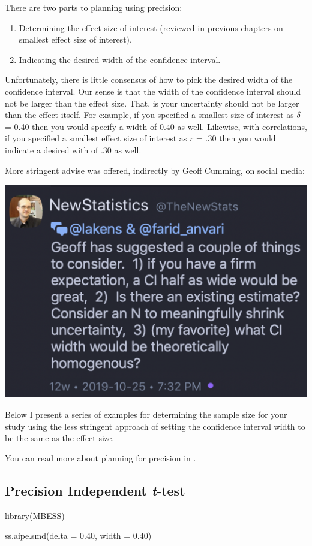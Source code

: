 \documentclass[
]{krantz}
\makeatletter
\newenvironment{Shaded}{\begin{snugshade}}{\end{snugshade}}
\newcommand{\AttributeTok}[1]{\textcolor[rgb]{0.61,0.61,0.61}{#1}}
\newcommand{\FloatTok}[1]{\textcolor[rgb]{0.06,0.06,0.06}{#1}}
\newcommand{\FunctionTok}[1]{\textcolor[rgb]{0,0,0}{#1}}
\newcommand{\NormalTok}[1]{#1}
\newenvironment{kframe}{%
\medskip{}
\setlength{\fboxsep}{.8em}
 \def\at@end@of@kframe{}%
 \ifinner\ifhmode%
  \def\at@end@of@kframe{\end{minipage}}%
  \begin{minipage}{\columnwidth}%
 \fi\fi%
 \def\FrameCommand##1{\hskip\@totalleftmargin \hskip-\fboxsep
 \colorbox{shadecolor}{##1}\hskip-\fboxsep
     \hskip-\linewidth \hskip-\@totalleftmargin \hskip\columnwidth}%
 \MakeFramed {\advance\hsize-\width
   \@totalleftmargin\z@ \linewidth\hsize
   \@setminipage}}%
 {\par\unskip\endMakeFramed%
 \at@end@of@kframe}
\renewenvironment{Shaded}{\begin{kframe}}{\end{kframe}}
\makeatother
\begin{document}
There are two parts to planning using precision:

\begin{enumerate}
\def\labelenumi{\arabic{enumi}.}
\item
  Determining the effect size of interest (reviewed in previous chapters on smallest effect size of interest).
\item
  Indicating the desired width of the confidence interval.
\end{enumerate}

Unfortunately, there is little consensus of how to pick the desired width of the confidence interval. Our sense is that the width of the confidence interval should not be larger than the effect size. That, is your uncertainty should not be larger than the effect itself. For example, if you specified a smallest size of interest as \(\delta\) = 0.40 then you would specify a width of 0.40 as well. Likewise, with correlations, if you specified a smallest effect size of interest as \(r\) = .30 then you would indicate a desired with of .30 as well.

More stringent advise was offered, indirectly by Geoff Cumming, on social media:

\includegraphics[width=0.4\linewidth]{ch_precision_sample_size/images/precision_tweet}

Below I present a series of examples for determining the sample size for your study using the less stringent approach of setting the confidence interval width to be the same as the effect size.

You can read more about planning for precision in \citet{rothman2018planning}.

\hypertarget{precision-independent-t-test}{%
\subsection{\texorpdfstring{Precision Independent \emph{t}-test}{Precision Independent t-test}}\label{precision-independent-t-test}}

\begin{Shaded}
\begin{Highlighting}[]
\FunctionTok{library}\NormalTok{(MBESS)}

\FunctionTok{ss.aipe.smd}\NormalTok{(}\AttributeTok{delta =} \FloatTok{0.40}\NormalTok{,}
            \AttributeTok{width =} \FloatTok{0.40}\NormalTok{)}
\end{Highlighting}
\end{Shaded}
\end{document}
